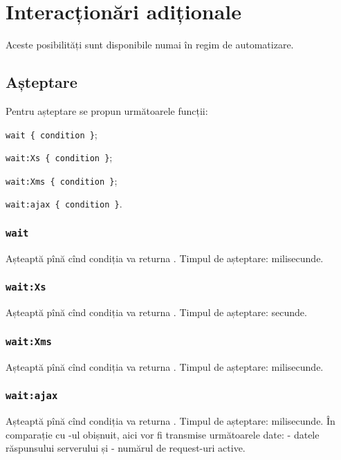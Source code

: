 \section{Interacționări adiționale}

Aceste posibilități sunt disponibile numai în regim de automatizare.

\subsection{Așteptare}

Pentru așteptare se propun următoarele funcții:
\begin{icItems}
	\item \lstinline|wait { condition }|;
	\item \lstinline|wait:Xs { condition }|;
	\item \lstinline|wait:Xms { condition }|;
	\item \lstinline|wait:ajax { condition }|.
\end{icItems}

\subsubsection{\lstinline|wait|}

Așteaptă pînă cînd condiția va returna \true. Timpul de așteptare:  milisecunde. 

\subsubsection{\lstinline|wait:Xs|}

Așteaptă pînă cînd condiția va returna \true. Timpul de așteptare:  secunde. 

\subsubsection{\lstinline|wait:Xms|}

Așteaptă pînă cînd condiția va returna \true. Timpul de așteptare:  milisecunde. 

\subsubsection{\lstinline|wait:ajax|}

Așteaptă pînă cînd condiția va returna \true. Timpul de așteptare:  milisecunde. În comparație cu -ul obișnuit, aici vor fi transmise următoarele date:  - datele răspunsului serverului și  - numărul de request-uri active.

